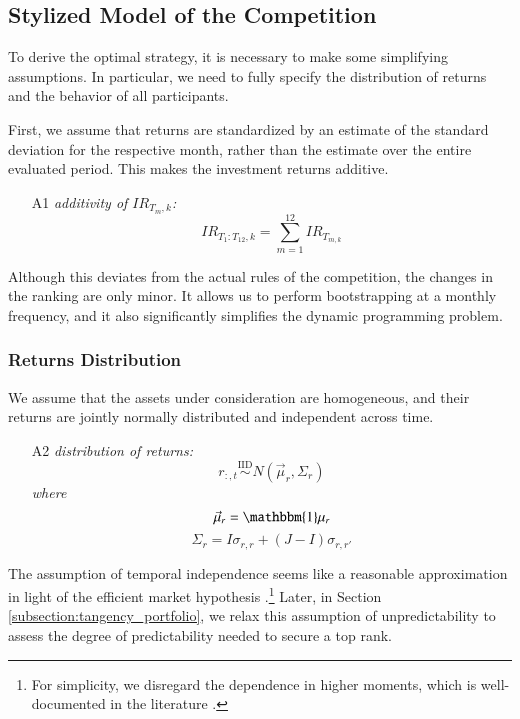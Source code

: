 \documentclass[3p,times,twocolumn]{elsarticle}
\begin{document}
\subsection{Stylized Model of the Competition}\label{subsection:stylized_model}

To derive the optimal strategy, it is necessary to make some simplifying assumptions.
In particular, we need to fully specify the distribution of returns and the behavior of all participants.

First, we assume that returns are standardized by an estimate of the standard deviation for the respective month, rather than the estimate over the entire evaluated period.
This makes the investment returns additive.
\begin{itemize}
    \item[A1]  \emph{additivity of $IR_{T_{m},k}$:}
        \begin{equation}
            IR_{T_{1}:T_{12},k}= \sum_{m=1}^{12}IR_{T_{m,k}}
        \end{equation}
\end{itemize}
Although this deviates from the actual rules of the competition, the changes in the ranking are only minor.
It allows us to perform bootstrapping at a monthly frequency, and it also significantly simplifies the dynamic programming problem.

\subsubsection{Returns Distribution}

We assume that the assets under consideration are homogeneous, and their returns are jointly normally distributed and independent across time.
\begin{itemize}
    \item[A2]  \emph{distribution of returns:}
        \begin{equation}
            r_{:,t} \overset{\mathrm{IID}}{\sim} N(\vec{\mu}_{r}, \Sigma_{r})
        \end{equation}
        \emph{where}
        \begin{equation}
            \vec{\mu}_{r}=\mathbbm{1}\mu_{r}
        \end{equation}
        \begin{equation}
            \Sigma_{r}=I\sigma_{r,r} + (J-I)\sigma_{r,r'}
        \end{equation}
\end{itemize}
The assumption of temporal independence seems like a reasonable approximation in light of the efficient market hypothesis \citep[see, e.g.,][]{malkielReflectionsEfficientMarket2005}.\footnote{For simplicity, we disregard the dependence in higher moments, which is well-documented in the literature \citep[see, e.g.,][]{dieboldModelingVolatilityDynamics1995}.}
Later, in Section \ref{subsection:tangency_portfolio}, we relax this assumption of unpredictability to assess the degree of predictability needed to secure a top rank.
\end{document}
